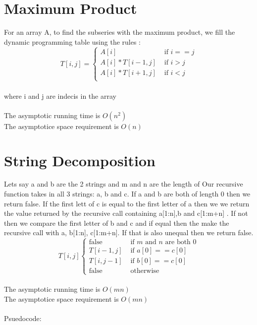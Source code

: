 \documentclass{article}
\begin{document}
\section{Maximum Product}
\label{sec:Maximum Product}
    For an array A, to find the subseries with the maximum product, we fill the dynamic programming table using the rules :
    \[
    T[i,j] =
    \begin{cases}
        A[i] &\text{ if } i == j\\
        A[i] * T[i-1, j] &\text{ if } i > j\\
        A[i] * T[i+1, j] &\text{ if } i < j\\
    \end{cases}
    \] \\where i and j are indecis in the array\\\\
    The asymptotic running time is $O(n^2)$\\
    The asymptotice space requirement is $O(n)$\\

\section{String Decomposition}
\label{sec:String Decomposition}
    Lets say a and b are the 2 strings and m and n are the length of
    Our recursive function takes in all 3 strings: a, b and c. If a and b are both of length 0 then we return false. If the first lett of c is equal to the first letter of a then we we return the value returned by the recursive call containing a[1:n],b and c[1:m+n] .
    If not then we compare the first letter of b and c and if equal then the make the recursive call with a, b[1:n], c[1:m+n]. If that is also unequal then we return false.
    \\
    \[
    T[i,j]
    \begin{cases}
        \text{false} &\text{ if }m \text{ and } n \text{ are both 0}\\
        T[i-1, j]&\text{ if }a[0] == c[0]\\
        T[i, j-1]&\text{ if }b[0] == c[0]\\
        \text{false} &\text{ otherwise}
    \end{cases}
    \]\\
    The asymptotic running time is $O(mn)$\\
    The asymptotice space requirement is $O(mn)$\\\\Psuedocode:
\end{document}
